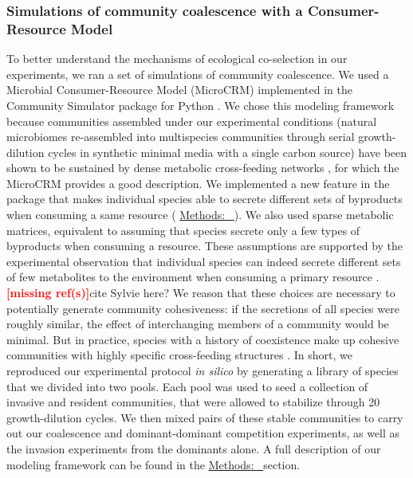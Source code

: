 \documentclass[a4paper,10pt]{article}
\newcommand{\mr}{\textcolor{red}{\textbf{[missing ref(s)]}}}
\newcommand{\methodsref}[1]{%
  \hyperref[{methods:#1}]{%
   Methods:~\nameref*{methods:#1}%
  }%
}
\begin{document}
\iffalse
\subsubsection*{Simulations of community coalescence with a Consumer-Resource Model}

To better understand the mechanisms of ecological co-selection in our experiments,
we ran a set of simulations of community coalescence. We used a Microbial Consumer-Resource
Model (MicroCRM) \cite{Goldford2018,Marsland2019} implemented in the Community Simulator package
for Python \cite{Marsland2020}. We chose this modeling framework because
communities assembled under our experimental conditions (natural microbiomes re-assembled into
multispecies communities through serial growth-dilution cycles in synthetic minimal media
with a single carbon source)
have been shown to be
sustained by dense metabolic cross-feeding networks
\cite{Goldford2018,Estrela2020},
for which the MicroCRM provides a good description.
We implemented a new feature in the package that makes individual species
able to secrete different sets of byproducts when consuming a same resource
(\methodsref{sim}).
We also used sparse metabolic matrices, equivalent to assuming that species secrete only a few
types of byproducts when consuming a resource. These assumptions are supported by the experimental
observation that individual species can indeed secrete different sets of few metabolites
to the environment when consuming a primary resource
\cite{Harcombe2014,Pinu2018}. \mr cite Sylvie here?
We reason that these choices are necessary to potentially generate community cohesiveness:
if the secretions of all species were roughly similar, the effect of interchanging members of
a community would be minimal. But in practice, species with a history of coexistence make up
cohesive communities with highly specific cross-feeding structures \cite{Goldford2018,Estrela2020}.
In short,
we reproduced our experimental protocol \textit{in silico}
by generating a library of species that we divided into two pools. Each pool was used to seed a
collection of invasive and resident communities, that were allowed to stabilize through 20
growth-dilution cycles. We then mixed pairs of these stable communities to carry out our coalescence
and dominant-dominant competition experiments,
as well as the invasion experiments from the dominants alone.
A full description of our modeling framework can be found in the \methodsref{sim} section.
\end{document}
